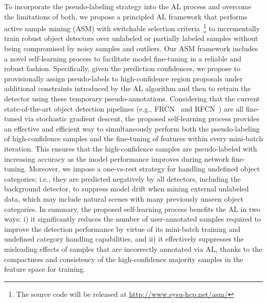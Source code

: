 \documentclass[journal]{IEEEtran}
\begin{document}
To incorporate the pseudo-labeling strategy into the AL process and overcome the limitations of both, we propose a principled AL framework that performs active sample mining ({ASM) with switchable selection criteria}~\footnote{The source code will be released at \url{http://www.sysu-hcp.net/asm/}} to incrementally train robust object detectors over unlabeled or partially labeled samples without being compromised by noisy samples and outliers. Our {ASM} framework includes a novel {self-learning} process to facilitate model fine-tuning in a reliable and robust fashion. Specifically, given the prediction confidences, we propose to provisionally assign pseudo-labels to high-confidence region proposals under {additional} constraints introduced by the AL {algorithm and then} to retrain the {detector using these temporary} pseudo-annotations. Considering that the current state-of-the-art object detection pipelines (e.g., FRCN~\cite{frcn} and RFCN~\cite{rfcn16NIPS}) are all fine-tuned via stochastic gradient descent, the proposed {self-learning} process provides an effective and efficient way to {simultaneously perform both the pseudo-labeling of high-confidence samples and the fine-tuning of features} within every mini-batch iteration. This ensures that the high-confidence samples are pseudo-labeled with increasing accuracy as the model performance improves during network fine-tuning. Moreover, we impose a one-vs-rest strategy for handling undefined object categories; i.e., they are predicted negatively by all detectors, including the background detector, {to suppress} model drift when mining external unlabeled data, which may include natural scenes with many previously unseen object categories. {In summary}, the proposed {self-learning} process benefits the AL in two ways: i) it  significantly {reduces} the number of user-annotated samples required to improve the detection performance by {virtue of its} mini-batch training and undefined category handling {capabilities}, and ii) it effectively suppresses the misleading effects of samples that are incorrectly annotated via AL, {thanks to} the compactness and consistency of the high-confidence majority samples in the feature space {for training}.
\end{document}

